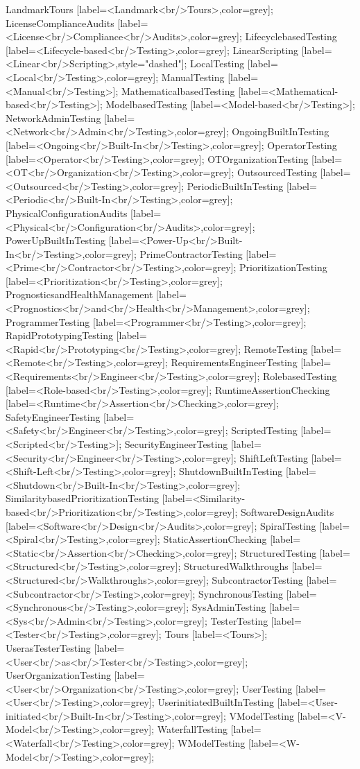 \documentclass{article}
\begin{document}
{LandmarkTours [label=<Landmark<br/>Tours>,color=grey];
LicenseComplianceAudits [label=<License<br/>Compliance<br/>Audits>,color=grey];
LifecyclebasedTesting [label=<Lifecycle-based<br/>Testing>,color=grey];
LinearScripting [label=<Linear<br/>Scripting>,style="dashed"];
LocalTesting [label=<Local<br/>Testing>,color=grey];
ManualTesting [label=<Manual<br/>Testing>];
MathematicalbasedTesting [label=<Mathematical-based<br/>Testing>];
ModelbasedTesting [label=<Model-based<br/>Testing>];
NetworkAdminTesting [label=<Network<br/>Admin<br/>Testing>,color=grey];
OngoingBuiltInTesting [label=<Ongoing<br/>Built-In<br/>Testing>,color=grey];
OperatorTesting [label=<Operator<br/>Testing>,color=grey];
OTOrganizationTesting [label=<OT<br/>Organization<br/>Testing>,color=grey];
OutsourcedTesting [label=<Outsourced<br/>Testing>,color=grey];
PeriodicBuiltInTesting [label=<Periodic<br/>Built-In<br/>Testing>,color=grey];
PhysicalConfigurationAudits [label=<Physical<br/>Configuration<br/>Audits>,color=grey];
PowerUpBuiltInTesting [label=<Power-Up<br/>Built-In<br/>Testing>,color=grey];
PrimeContractorTesting [label=<Prime<br/>Contractor<br/>Testing>,color=grey];
PrioritizationTesting [label=<Prioritization<br/>Testing>,color=grey];
PrognosticsandHealthManagement [label=<Prognostics<br/>and<br/>Health<br/>Management>,color=grey];
ProgrammerTesting [label=<Programmer<br/>Testing>,color=grey];
RapidPrototypingTesting [label=<Rapid<br/>Prototyping<br/>Testing>,color=grey];
RemoteTesting [label=<Remote<br/>Testing>,color=grey];
RequirementsEngineerTesting [label=<Requirements<br/>Engineer<br/>Testing>,color=grey];
RolebasedTesting [label=<Role-based<br/>Testing>,color=grey];
RuntimeAssertionChecking [label=<Runtime<br/>Assertion<br/>Checking>,color=grey];
SafetyEngineerTesting [label=<Safety<br/>Engineer<br/>Testing>,color=grey];
ScriptedTesting [label=<Scripted<br/>Testing>];
SecurityEngineerTesting [label=<Security<br/>Engineer<br/>Testing>,color=grey];
ShiftLeftTesting [label=<Shift-Left<br/>Testing>,color=grey];
ShutdownBuiltInTesting [label=<Shutdown<br/>Built-In<br/>Testing>,color=grey];
SimilaritybasedPrioritizationTesting [label=<Similarity-based<br/>Prioritization<br/>Testing>,color=grey];
SoftwareDesignAudits [label=<Software<br/>Design<br/>Audits>,color=grey];
SpiralTesting [label=<Spiral<br/>Testing>,color=grey];
StaticAssertionChecking [label=<Static<br/>Assertion<br/>Checking>,color=grey];
StructuredTesting [label=<Structured<br/>Testing>,color=grey];
StructuredWalkthroughs [label=<Structured<br/>Walkthroughs>,color=grey];
SubcontractorTesting [label=<Subcontractor<br/>Testing>,color=grey];
SynchronousTesting [label=<Synchronous<br/>Testing>,color=grey];
SysAdminTesting [label=<Sys<br/>Admin<br/>Testing>,color=grey];
TesterTesting [label=<Tester<br/>Testing>,color=grey];
Tours [label=<Tours>];
UserasTesterTesting [label=<User<br/>as<br/>Tester<br/>Testing>,color=grey];
UserOrganizationTesting [label=<User<br/>Organization<br/>Testing>,color=grey];
UserTesting [label=<User<br/>Testing>,color=grey];
UserinitiatedBuiltInTesting [label=<User-initiated<br/>Built-In<br/>Testing>,color=grey];
VModelTesting [label=<V-Model<br/>Testing>,color=grey];
WaterfallTesting [label=<Waterfall<br/>Testing>,color=grey];
WModelTesting [label=<W-Model<br/>Testing>,color=grey];

}
\end{document}
